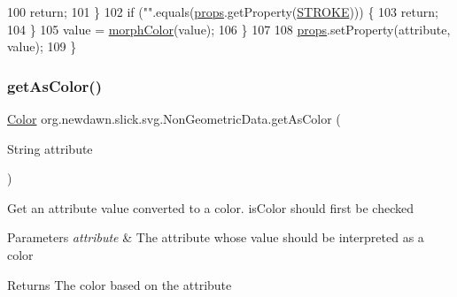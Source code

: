 \begin{DoxyCode}
100                 \textcolor{keywordflow}{return};
101             \}
102             \textcolor{keywordflow}{if} (\textcolor{stringliteral}{""}.equals(\mbox{\hyperlink{classorg_1_1newdawn_1_1slick_1_1svg_1_1_non_geometric_data_a75a905ff1c7bf271e32602cdc7f06191}{props}}.getProperty(\mbox{\hyperlink{classorg_1_1newdawn_1_1slick_1_1svg_1_1_non_geometric_data_a2e4170b7a30903a3789bae566a1604e4}{STROKE}}))) \{
103                 \textcolor{keywordflow}{return};
104             \}
105             value = \mbox{\hyperlink{classorg_1_1newdawn_1_1slick_1_1svg_1_1_non_geometric_data_a5f09ddab2253b5bb0c3bca43b6407d41}{morphColor}}(value);
106         \}
107         
108         \mbox{\hyperlink{classorg_1_1newdawn_1_1slick_1_1svg_1_1_non_geometric_data_a75a905ff1c7bf271e32602cdc7f06191}{props}}.setProperty(attribute, value);
109     \}
\end{DoxyCode}
\mbox{\label{classorg_1_1newdawn_1_1slick_1_1svg_1_1_non_geometric_data_a68187f6636101be64001bc748c04ef44}} 
\subsubsection{\texorpdfstring{get\+As\+Color()}{getAsColor()}}
{\footnotesize\ttfamily \mbox{\hyperlink{classorg_1_1newdawn_1_1slick_1_1_color}{Color}} org.\+newdawn.\+slick.\+svg.\+Non\+Geometric\+Data.\+get\+As\+Color (\begin{DoxyParamCaption}\item[{String}]{attribute }\end{DoxyParamCaption})\hspace{0.3cm}{\ttfamily [inline]}}

Get an attribute value converted to a color. is\+Color should first be checked


\begin{DoxyParams}{Parameters}
{\em attribute} & The attribute whose value should be interpreted as a color \\
\hline
\end{DoxyParams}
\begin{DoxyReturn}{Returns}
The color based on the attribute 
\end{DoxyReturn}

